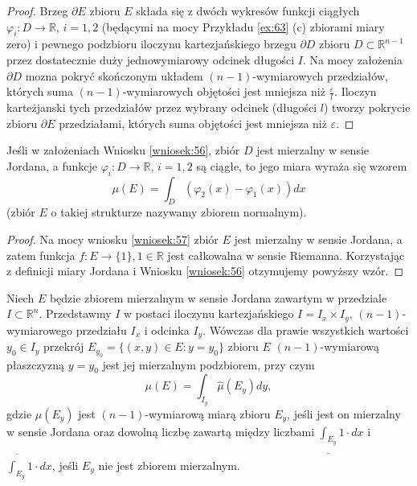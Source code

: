 \documentclass[leqno]{article}
\begin{document}
\begin{justify}
\begin{proof}
    Brzeg $\partial E$ zbioru $E$ składa się z dwóch wykresów funkcji ciągłych $\varphi_i : D \to \mathbb{R}$, $i = 1,2$ (będącymi na mocy Przykładu \ref{ex:63} (c)
    zbiorami miary zero) i pewnego podzbioru iloczynu kartezjańskiego brzegu $\partial D$ zbioru $D \subset \mathbb{R}^{n-1}$ przez 
    dostatecznie duży jednowymiarowy odcinek długości $I$. Na mocy założenia $\partial D$ mozna pokryć skończonym 
    układem $(n-1)$-wymiarowych przedziałów, których suma $(n-1)$-wymiarowych objętości jest mniejsza niż $\frac{\varepsilon}{l}$.
    Iloczyn karteżjanski tych przedziałów przez wybrany odcinek (długości $l$) tworzy pokrycie zbioru $\partial E$ przedziałami, których suma objętości jest mniejsza niż $\varepsilon$.
\end{proof}

\begin{wniosek}
{
    Jeśli w założeniach Wniosku \ref{wniosek:56}, zbiór $D$ jest mierzalny w sensie Jordana, a funkcje $\varphi_i : D \to \mathbb{R}$, $i =1 ,2$ są ciągłe,
    to jego miara wyraża się wzorem
    \[
        \mu(E) = \int_D (\varphi_2(x) - \varphi_1(x))dx
    \]
    (zbiór $E$ o takiej strukturze nazywamy zbiorem normalnym).
}
\end{wniosek}

\begin{proof}
    Na mocy wniosku \ref{wniosek:57} zbiór $E$ jest mierzalny w sensie Jordana, a zatem funkcja $f : E \to \{1\}, 1 \in \mathbb{R}$ 
    jest całkowalna w sensie Riemanna. Korzystając z definicji miary Jordana i Wniosku \ref{wniosek:56} otzymujemy powyższy wzór.
\end{proof}

\begin{wniosek}
{
    Niech $E$ będzie zbiorem mierzalnym w sensie Jordana zawartym w przedziale $I \subset \mathbb{R}^n$.
    Przedstawmy $I$ w postaci iloczynu kartezjańskiego $I = I_x \times I_y$, $(n-1)$-wymiarowego przedziału $I_x$ i odcinka $I_y$.
    Wówczas dla prawie wszystkich wartości $y_0 \in I_y$ przekrój $E_{y_0} = \{(x,y) \in E : y = y_0\}$ zbioru $E$ $(n-1)$-wymiarową płaszczyzną 
    $y = y_0$ jest jej mierzalnym podzbiorem, przy czym 
    \[
        \mu(E) = \int_{I_y} \hat{\mu}(E_y)dy,
    \]
    gdzie $\hat{\mu}(E_y)$ jest $(n-1)$-wymiarową miarą zbioru $E_y$, jeśli jest on mierzalny w sensie Jordana oraz 
    dowolną liczbę zawartą między liczbami $\underline{\int_{E_y}}1 \cdot dx$ i $\overline{\int_{E_y}}1 \cdot dx$, 
    jeśli $E_y$ nie jest zbiorem mierzalnym.
}
\end{wniosek}


\end{justify}
\end{document}
